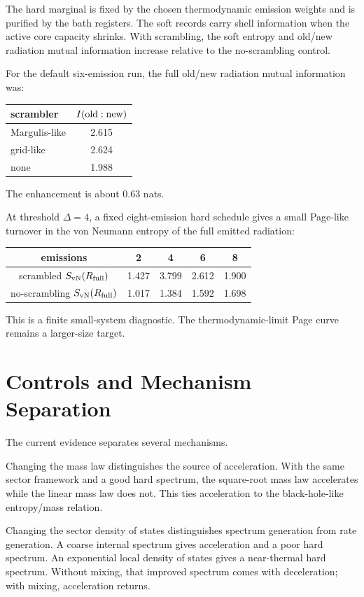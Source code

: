 \documentclass[aps,prd,onecolumn,longbibliography,nofootinbib]{revtex4-2}
\newcommand{\Svn}{S_{\rm vN}}
\begin{document}
The hard marginal is fixed by the chosen thermodynamic emission weights and is
purified by the bath registers.  The soft records carry shell information when
the active core capacity shrinks.  With scrambling, the soft entropy and
old/new radiation mutual information increase relative to the no-scrambling
control.

For the default six-emission run, the full old/new radiation mutual
information was:
\begin{center}
\begin{tabular}{lc}
\toprule
scrambler & $I({\rm old}:{\rm new})$\\
\midrule
Margulis-like & 2.615\\
grid-like     & 2.624\\
none          & 1.988\\
\bottomrule
\end{tabular}
\end{center}
The enhancement is about $0.63$ nats.

At threshold $\Delta=4$, a fixed eight-emission hard schedule gives a small
Page-like turnover in the von Neumann entropy of the full emitted radiation:
\begin{center}
\begin{tabular}{ccccc}
\toprule
emissions & 2 & 4 & 6 & 8\\
\midrule
scrambled $\Svn(R_{\rm full})$ & 1.427 & 3.799 & 2.612 & 1.900\\
no-scrambling $\Svn(R_{\rm full})$ & 1.017 & 1.384 & 1.592 & 1.698\\
\bottomrule
\end{tabular}
\end{center}
This is a finite small-system diagnostic.  The thermodynamic-limit Page curve
remains a larger-size target.

\section{Controls and Mechanism Separation}
\label{sec:controls}

The current evidence separates several mechanisms.

Changing the mass law distinguishes the source of acceleration.  With the same
sector framework and a good hard spectrum, the square-root mass law accelerates
while the linear mass law does not.  This ties acceleration to the
black-hole-like entropy/mass relation.

Changing the sector density of states distinguishes spectrum generation from
rate generation.  A coarse internal spectrum gives acceleration and a poor
hard spectrum.  An exponential local density of states gives a near-thermal
hard spectrum.  Without mixing, that improved spectrum comes with deceleration;
with mixing, acceleration returns.
\end{document}
